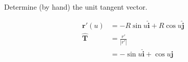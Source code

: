 Determine (by hand) the unit tangent vector.

\begin{solution}
\begin{align*}
    \boldsymbol{r'}(u) &= -R\sin u \hat{\boldsymbol{i}} + R\cos u \hat{\boldsymbol{j}} \\
    \boldsymbol{\hat{T}} &= \frac{r'}{|r'|} \\
    &= -\sin u \hat{\boldsymbol{i}} + \cos u \hat{\boldsymbol{j}}
\end{align*}
\end{solution}